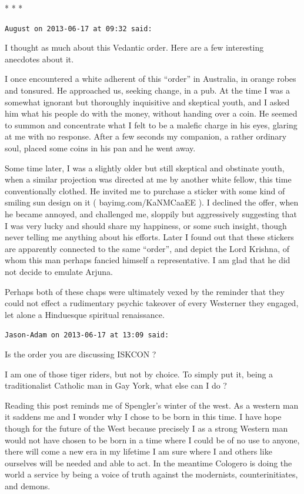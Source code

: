 
\begin{center}* * *\end{center}

\begin{footnotesize}
\begin{sffamily}
\texttt{August on 2013-06-17 at 09:32 said:}

I thought as much about this Vedantic order. Here are a few interesting anecdotes about it.

I once encountered a white adherent of this ``order'' in Australia, in orange robes and tonsured. He approached us, seeking change, in a pub. At the time I was a somewhat ignorant but thoroughly inquisitive and skeptical youth, and I asked him what his people do with the money, without handing over a coin. He seemed to summon and concentrate what I felt to be a malefic charge in his eyes, glaring at me with no response. After a few seconds my companion, a rather ordinary soul, placed some coins in his pan and he went away.

Some time later, I was a slightly older but still skeptical and obstinate youth, when a similar projection was directed at me by another white fellow, this time conventionally clothed. He invited me to purchase a sticker with some kind of smiling sun design on it ( bayimg.com/KaNMCaaEE ). I declined the offer, when he became annoyed, and challenged me, sloppily but aggressively suggesting that I was very lucky and should share my happiness, or some such insight, though never telling me anything about his efforts. Later I found out that these stickers are apparently connected to the same ``order'', and depict the Lord Krishna, of whom this man perhaps fancied himself a representative. I am glad that he did not decide to emulate Arjuna.

Perhaps both of these chaps were ultimately vexed by the reminder that they could not effect a rudimentary psychic takeover of every Westerner they engaged, let alone a Hinduesque spiritual renaissance.

\hfill

\texttt{Jason-Adam on 2013-06-17 at 13:09 said:}

Is the order you are discussing ISKCON ?

I am one of those tiger riders, but not by choice. To simply put it, being a traditionalist Catholic man in Gay York, what else can I do ?

Reading this post reminds me of Spengler's winter of the west. As a western man it saddens me and I wonder why I chose to be born in this time. I have hope though for the future of the West because precisely I as a strong Western man would not have chosen to be born in a time where I could be of no use to anyone, there will come a new era in my lifetime I am sure where I and others like ourselves will be needed and able to act. In the meantime Cologero is doing the world a service by being a voice of truth against the modernists, counterinitiates, and demons.


\end{sffamily}
\end{footnotesize}
